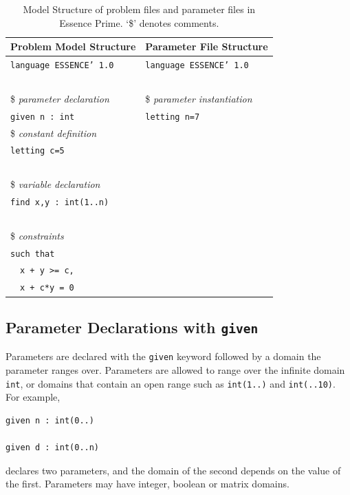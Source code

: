 \documentclass[a4paper]{article}
\newcommand{\eprime}{{\sc Essence Prime}\xspace}
\begin{document}
\begin{table}
\begin{center}
\begin{tabular}{|l||l|}
\hline
Problem Model Structure & Parameter File Structure \\
\hline
\hline
{\tt language ESSENCE' 1.0}  & {\tt language ESSENCE' 1.0}  \\
\ & \\
\$ {\em parameter declaration}       & \$ {\em parameter instantiation} \\
{\tt given n : int}         & {\tt letting n=7} \\
\$ {\em constant definition}        & \\
{\tt letting c=5 }  & \\
\ & \\
\$ {\em variable declaration }       & \\
{\tt find x,y : int(1..n) } & \\
\ & \\
\$ {\em constraints}                 & \\
{\tt such that } & \\
\ \ {\tt x + y >= c,}    & \\  
\ \ {\tt x + c*y = 0}    & \\  
\hline
\end{tabular}
\caption{Model Structure of problem files and parameter files in \eprime. `\$' denotes comments.}\label{tab:modelstructure}
\end{center}
\end{table}

\subsection{Parameter Declarations with {\tt given}}

Parameters are declared with the {\tt given} keyword followed 
by a domain the parameter ranges over. Parameters are allowed to 
range over the infinite domain {\tt int}, or domains that contain an open range
such as {\tt int(1..)} and {\tt int(..10)}. For example,

\begin{verbatim}
given n : int(0..)

given d : int(0..n)
\end{verbatim}

declares two parameters, and the domain of the second depends on the value of
the first. Parameters may have integer, boolean or matrix domains. 
\end{document}
